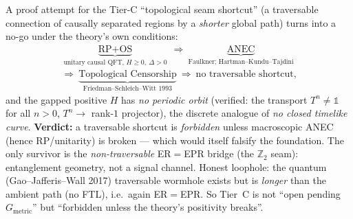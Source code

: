 \documentclass[11pt,a4paper]{article}
\newcommand{\Z}{\mathbb Z}
\begin{document}
\begin{gapbox}
A proof attempt for the Tier-C ``topological seam shortcut'' (a traversable connection of causally
separated regions by a \emph{shorter} global path) turns into a no-go under the theory's own conditions:
\[
  \begin{gathered}
  \underbrace{\text{RP}+\text{OS}}_{\text{unitary causal QFT, }H\ge0,\ \Delta>0}\ \Rightarrow\
  \underbrace{\text{ANEC}}_{\text{Faulkner; Hartman--Kundu--Tajdini}}\\[3pt]
  \Rightarrow\
  \underbrace{\text{Topological Censorship}}_{\text{Friedman--Schleich--Witt 1993}}\ \Rightarrow\ \text{no traversable shortcut,}
  \end{gathered}
\]
and the gapped positive $H$ has \emph{no periodic orbit} (verified: the transport $T^n\neq\mathbb 1$ for all
$n>0$, $T^n\to$ rank-$1$ projector), the discrete analogue of \emph{no closed timelike curve}. \textbf{Verdict:}
a traversable shortcut is \emph{forbidden} unless macroscopic ANEC (hence RP/unitarity) is broken --- which
would itself falsify the foundation. The only survivor is the \emph{non-traversable} ER$=$EPR bridge (the
$\Z_2$ seam): entanglement geometry, not a signal channel. Honest loophole: the quantum (Gao--Jafferis--Wall
2017) traversable wormhole exists but is \emph{longer} than the ambient path (no FTL), i.e.\ again ER$=$EPR.
So Tier~C is not ``open pending $G_{\mathrm{metric}}$'' but ``forbidden unless the theory's positivity breaks''.
\end{gapbox}

\end{document}
